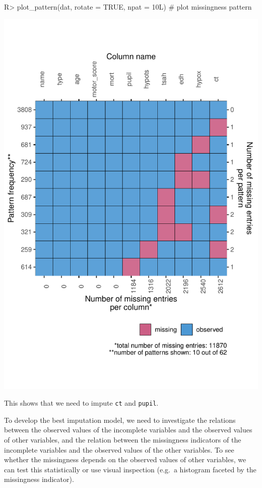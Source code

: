 \documentclass[
]{jss}
\begin{document}
\begin{CodeChunk}
\begin{CodeInput}
R> plot_pattern(dat, rotate = TRUE, npat = 10L)  # plot missingness pattern
\end{CodeInput}


\begin{center}\includegraphics{Imputation_of_Incomplete_Multilevel_Data_files/figure-latex/pattern-1} \end{center}

\end{CodeChunk}

This shows that we need to impute \texttt{ct} and \texttt{pupil}.

To develop the best imputation model, we need to investigate the
relations between the observed values of the incomplete variables and
the observed values of other variables, and the relation between the
missingness indicators of the incomplete variables and the observed
values of the other variables. To see whether the missingness depends on
the observed values of other variables, we can test this statistically
or use visual inspection (e.g.~a histogram faceted by the missingness
indicator).
\end{document}
